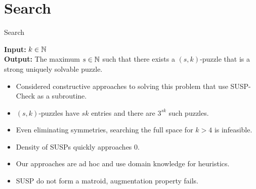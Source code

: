 \documentclass[t,10pt,
mathserif,xcolor=dvipsnames]{beamer}
\begin{document}
\section{Search}


\begin{myframe}{Search}

  \begin{problem}
    \textbf{Input:} $k \in \mathbb{N}$ \\[1ex] \textbf{Output:} The maximum
    $s\in \mathbb{N}$ such that there exists a $(s,k)$-puzzle that is a strong
    uniquely solvable puzzle.
  \end{problem}

  \begin{itemize}
  \item Considered constructive approaches to solving this
    problem that use SUSP-Check as a subroutine.
  \item $(s,k)$-puzzles have $sk$ entries and there are $3^{sk}$ such puzzles.
  \item Even eliminating symmetries, searching the full space for $k >
    4$ is infeasible.
  \item Density of SUSPs quickly approaches 0.
  \item Our approaches are ad hoc and use domain knowledge for heuristics.
  \item SUSP do not form a matroid, augmentation property fails.
  \end{itemize}

  
\end{myframe}
\end{document}

